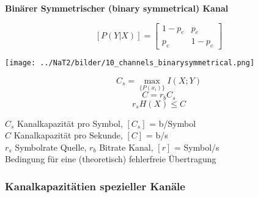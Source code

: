 \textbf{Binärer Symmetrischer (binary symmetrical) Kanal} \\
\begin{minipage}{14cm}

	$$ [P(Y | X)] = \begin{bmatrix}
           		1-p_e & p_e \\
           		p_e & 1-p_e
           \end{bmatrix} $$
\end{minipage}
\begin{minipage}{4cm}
\begin{center}
	\texttt{[image: ../NaT2/bilder/10\_channels\_binarysymmetrical.png]}
\end{center}
\end{minipage}




%

\begin{minipage}[c]{8cm}
	$$ C_s = \max\limits_{\{ P(x_i) \}}{I (X; Y)} $$
	$$ C = r_b C_s $$
	$$ r_s H(X) \leq C$$
\end{minipage}
\begin{minipage}[c]{10cm}
	$C_s$ Kanalkapazität pro Symbol, $[C_s]$ = b/Symbol \\
	$C$ Kanalkapazität pro Sekunde, $[C]$ = b/s \\
	$r_s$ Symbolrate Quelle, $r_b$ Bitrate Kanal, $[r]$ = Symbol/s \\
	Bedingung für eine (theoretisch) fehlerfreie Übertragung
\end{minipage}

\subsubsection{Kanalkapazitätien spezieller Kanäle}


